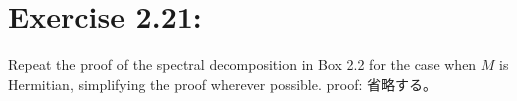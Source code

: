 \section{\Large Exercise 2.21:}
Repeat the proof of the spectral decomposition in Box 2.2 for the case
when $M$ is Hermitian, simplifying the proof wherever possible.
\newline
{\large proof:}
省略する。
